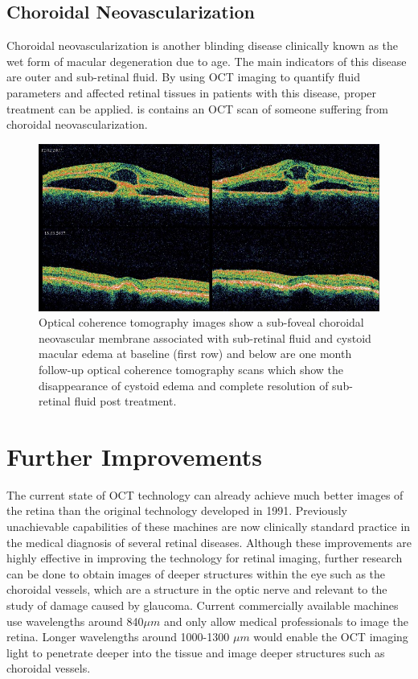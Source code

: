 \subsection{Choroidal Neovascularization}
Choroidal neovascularization is another blinding disease clinically known as the wet form of macular degeneration due to age.  The main indicators of this disease are outer and sub-retinal fluid. \cite{mbib_4}  By using OCT imaging to quantify fluid parameters and affected retinal tissues in patients with this disease, proper treatment can be applied.\cite{mbib_4}  is contains an OCT scan of someone suffering from choroidal neovascularization.

\begin{figure}[htbp]
\centering
\includegraphics{figures/morgan_8}
\caption{ Optical coherence tomography images show a sub-foveal choroidal neovascular membrane associated with sub-retinal fluid and cystoid macular edema at baseline (first row) and below are one month follow-up optical coherence tomography scans which show the disappearance of cystoid edema and complete resolution of sub-retinal fluid post treatment. \cite{mbib_11} }
\label{fig:m_8}
\end{figure}

\section{Further Improvements}
The current state of OCT technology can already achieve much better images 
of the retina than the
original technology developed in 1991.  Previously unachievable
capabilities of these machines are now clinically standard practice in the
medical diagnosis of several retinal diseases.  Although these improvements
are highly effective in improving the technology for retinal imaging, further
research can be done to obtain images of deeper structures within the eye such
as the choroidal vessels, which are a structure in the optic nerve and
relevant to the study of damage caused by glaucoma. \cite{mbib_4}  Current
commercially available
machines use wavelengths around 840$\mu m$ and only allow medical professionals
to image the retina.  Longer wavelengths around 1000-1300 $\mu m$ would enable
the OCT imaging light to penetrate deeper into the tissue and image deeper
structures such as choroidal vessels. \cite{mbib_4}




